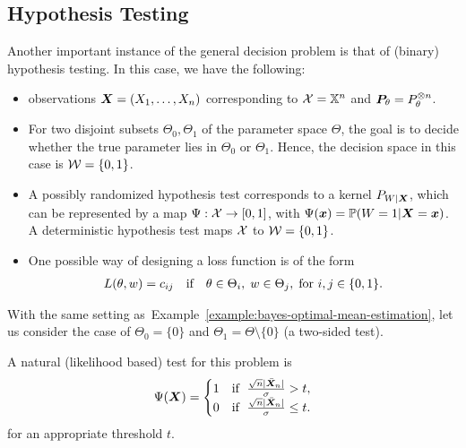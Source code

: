 \documentclass[12pt]{article}
\begin{document}
\subsection{Hypothesis Testing}
	Another important instance of the general decision problem is that of  (binary) hypothesis testing. In this case, we have the following: 
	\begin{itemize}
		\item \iid observations $\X = (X_1, \ldots, X_n)$ corresponding to $\calX = \bbX^n$ and $\P_\theta =  P_\theta^{\otimes n}$. 
		\item For two disjoint subsets $\Theta_0, \Theta_1$ of the parameter space $\Theta$, the goal is to decide whether the true parameter lies in $\Theta_0$ or $\Theta_1$. Hence, the  decision space in this case  is $\calW = \{0, 1\}$. 

		\item A possibly randomized hypothesis test corresponds to a kernel $P_{W|\X}$, which can be represented by a map $\Psi: \calX \to [0,1]$, with $\Psi(\bx) = \mathbb{P}(W=1|\X=\bx)$. A deterministic hypothesis test maps $\calX$ to $\calW=\{0,1\}$. 
		
		
		\item One possible way of designing a loss function is of the form 
		\begin{align}
			L(\theta, w) = c_{ij} \qtext{if} \theta \in \Theta_i, \; w \in \Theta_j, \; \text{for } i,j \in \{0,1\}. 
		\end{align}
	\end{itemize}
	
	\begin{example}
		\label{example:hypothesis-testing-GLM} With the same setting as~Example~\ref{example:bayes-optimal-mean-estimation}, let us consider the case of $\Theta_0= \{0\}$ and $\Theta_1 = \Theta \setminus \{0\}$ (a two-sided test). 

		A natural (likelihood based) test for this problem is 
		\begin{align}
			\Psi(\X) = \begin{cases}
			1 & \text{if }\; \frac{\sqrt{n}|\bar{\X}_n|}{\sigma} > t,  \\
			0 & \text{if }\; \frac{\sqrt{n}|\bar{\X}_n|}{\sigma} \leq t. 
			\end{cases}
		\end{align}
		for an appropriate threshold $t$. 
	\end{example}
\end{document}
